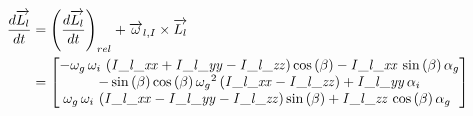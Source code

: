 \begin{align*}
\frac{d\overrightarrow{L_{l}}}{dt}&=\left(\frac{d\overrightarrow{L_{l}}}{dt}\right)_{rel}+\overrightarrow{\omega}_{l,I}\times  \overrightarrow{L_{l}}\\
&=\begin{bmatrix}
-\omega_{g}\,\omega_{i}\, \left( {\it 
I\_l\_xx}+{\it I\_l\_yy}-{\it I\_l\_zz} \right) \cos \left( \beta
 \right) -{\it I\_l\_xx}\,\sin \left( \beta \right) \alpha_{g}
\\ 
-\sin \left( \beta \right) \cos \left( \beta
 \right) {\omega_{g}}^{2} \left( {\it I\_l\_xx}-{\it I\_l\_zz}
 \right) +{\it I\_l\_yy}\,\alpha_{i}\\ 
 \omega_{g}\,
\omega_{i}\, \left( {\it I\_l\_xx}-{\it I\_l\_yy}-{\it I\_l\_zz}
 \right) \sin \left( \beta \right) +{\it I\_l\_zz}\,\cos \left( \beta
 \right) \alpha_{g}\
\end{bmatrix}
\end{align*}

